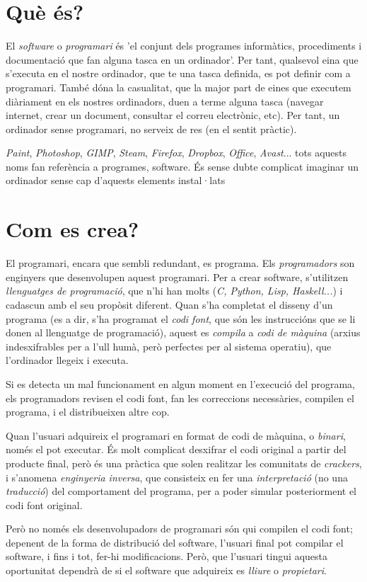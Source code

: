 \section{Què és?}
El \emph{software} o \emph{programari} és 'el conjunt dels programes informàtics, procediments i documentació que fan alguna tasca en un ordinador'. Per tant, qualsevol eina que s'executa en el nostre ordinador, que te una tasca definida, es pot definir com a programari. També dóna la casualitat, que la major part de eines que executem diàriament en els nostres ordinadors, duen a terme alguna tasca
(navegar internet, crear un document, consultar el correu electrònic, etc). Per tant, un ordinador sense programari, no serveix de res (en el sentit pràctic).

\emph{Paint}, \emph{Photoshop}, \emph{GIMP}, \emph{Steam}, \emph{Firefox}, \emph{Dropbox}, \emph{Office}, \emph{Avast}... tots aquests noms fan referència a programes, software. És 
sense dubte complicat imaginar un ordinador sense cap d'aquests elements instal·lats

\section{Com es crea?}
El programari, encara que sembli redundant, es programa. Els \emph{programadors}
son enginyers que desenvolupen aquest programari. Per a crear software, s'utilitzen
\emph{llenguatges de programació}, que n'hi han molts (\emph{C, Python, Lisp, Haskell...})
i cadascun amb el seu propòsit diferent. Quan s'ha completat el disseny d'un programa
(es a dir, s'ha programat el \emph{codi font}, que són les instruccións que se li donen al
llenguatge de programació), aquest es \emph{compila} a \emph{codi de màquina} (arxius indesxifrables per
a l'ull humà, però perfectes per al sistema operatiu), que l'ordinador llegeix i executa.

Si es detecta un mal funcionament en algun moment en l'execució del programa, els
programadors revisen el codi font, fan les correccions necessàries, compilen el programa,
i el distribueixen altre cop.

Quan l'usuari adquireix el programari en format de codi de màquina, o \emph{binari}, només el pot
executar. És molt complicat desxifrar el codi original a partir del producte final, però és una
pràctica que solen realitzar les comunitats de \emph{crackers}, i s'anomena \emph{enginyeria inversa},
que consisteix en fer una \emph{interpretació} (no una \emph{traducció}) del comportament del programa,
per a poder simular posteriorment el codi font original.

Però no només els desenvolupadors de programari són qui compilen el codi font; depenent de la forma
de distribució del software, l'usuari final pot compilar el software, i fins i tot, fer-hi modificacions. Però, que l'usuari tingui aquesta oportunitat dependrà de si el software que adquireix es \emph{lliure} o \emph{propietari}.
